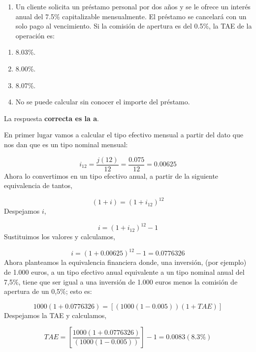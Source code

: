 \documentclass[
  letterpaper,
  DIV=11,
  numbers=noendperiod]{scrreprt}
\providecommand{\tightlist}{%
  \setlength{\itemsep}{0pt}\setlength{\parskip}{0pt}}\usepackage{longtable,booktabs,array}
\begin{document}
\begin{enumerate}
\def\labelenumi{\arabic{enumi}.}
\setcounter{enumi}{65}
\tightlist
\item
  Un cliente solicita un préstamo personal por dos años y se le ofrece
  un interés anual del 7.5\% capitalizable mensualmente. El préstamo se
  cancelará con un solo pago al vencimiento. Si la comisión de apertura
  es del 0.5\%, la TAE de la operación es:
\end{enumerate}

\begin{enumerate}
\def\labelenumi{\alph{enumi})}
\item
  8.03\%.
\item
  8.00\%.
\item
  8.07\%.
\item
  No se puede calcular sin conocer el importe del préstamo.
\end{enumerate}

\begin{tcolorbox}[enhanced jigsaw, left=2mm, opacityback=0, colback=white, breakable, arc=.35mm, bottomrule=.15mm, rightrule=.15mm, toprule=.15mm, leftrule=.75mm, colframe=quarto-callout-tip-color-frame]
\begin{minipage}[t]{5.5mm}
\textcolor{quarto-callout-tip-color}{\faLightbulb}
\end{minipage}%
\begin{minipage}[t]{\textwidth - 5.5mm}

La respuesta \textbf{correcta es la a}.

En primer lugar vamos a calcular el tipo efectivo mensual a partir del
dato que nos dan que es un tipo nominal mensual:

\[i_{12}=\frac{j\left(12\right)}{12}=\frac{0.075}{12}=0.00625\] Ahora lo
convertimos en un tipo efectivo anual, a partir de la siguiente
equivalencia de tantos,

\[\left(1+i\right)=\left(1+i_{12}\right)^{12}\] Despejamos \(i\),

\[i=\left(1+i_{12}\right)^{12}-1\] Sustituimos los valores y calculamos,

\[i=\left(1+0.00625\right)^{12}-1=0.0776326\] Ahora planteamos la
equivalencia financiera donde, una inversión, (por ejemplo) de 1.000
euros, a un tipo efectivo anual equivalente a un tipo nominal anual del
7,5\%, tiene que ser igual a una inversión de 1.000 euros menos la
comisión de apertura de un 0,5\%; esto es:

\[1000\left(1+0.0776326\right)=\left[\left(1000\left(1-0.005\right)\right)\left(1+TAE\right)\right]\]
Despejamos la TAE y calculamos,

\[TAE=\left[\frac{1000\left(1+0.0776326\right) }{ \left(1000\left(1-0.005\right)\right)}\right]-1=0.0083(8.3\%)\]

\end{minipage}%
\end{tcolorbox}
\end{document}
